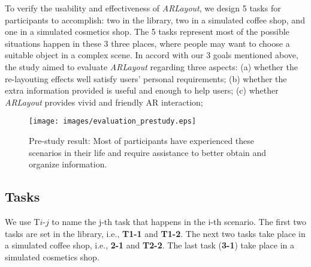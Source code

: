 To verify the usability and effectiveness of \textit{ARLayout},
we design 5 tasks for participants to accomplish:
two in the library, two in a simulated coffee shop, and one in a simulated cosmetics shop.
The 5 tasks represent most of the possible situations happen in these 3 three places,
where people may want to choose a suitable object in a complex scene.
In accord with our 3 goals mentioned above,
the study aimed to evaluate \textit{ARLayout} regarding three aspects:
(a) whether the re-layouting effects well satisfy users' personal requirements;
(b) whether the extra information provided is useful and enough to help users;
(c) whether \textit{ARLayout} provides vivid and friendly AR interaction;


\begin{figure}[htp]
    \centering
    \texttt{[image: images/evaluation\_prestudy.eps]}
    \caption{
        Pre-study result: Most of participants have experienced these scenarios in their life
        and require assistance to better obtain and organize information.
    }
    \label{fig:pre_study}
\end{figure}


\subsection{Tasks}
We use T$i$-$j$ to name the j-th task that happens in the i-th scenario.
The first two tasks are set in the library, i.e., \textbf{T1-1} and \textbf{T1-2}.
The next two tasks take place in a simulated coffee shop, i.e., \textbf{2-1} and \textbf{T2-2}.
The last task (\textbf{3-1}) take place in a simulated cosmetics shop.



